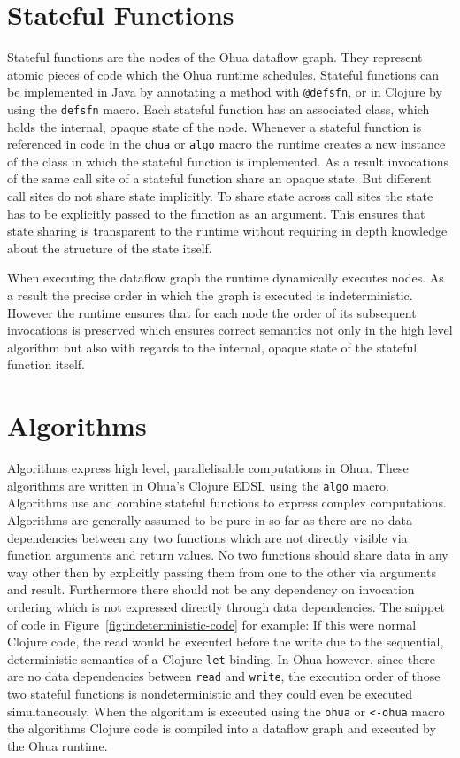 \section{Stateful Functions}


Stateful functions are the nodes of the Ohua dataflow graph.
They represent atomic pieces of code which the Ohua runtime schedules.
Stateful functions can be implemented in Java by annotating a method with \texttt{@defsfn}, or in Clojure by using the \texttt{defsfn} macro.
Each stateful function has an associated class, which holds the internal, opaque state of the node.
Whenever a stateful function is referenced in code in the \texttt{ohua} or \texttt{algo} macro the runtime creates a new instance of the class in which the stateful function is implemented.
As a result invocations of the same call site of a stateful function share an opaque state.
But different call sites do not share state implicitly.
To share state across call sites the state has to be explicitly passed to the function as an argument.
This ensures that state sharing is transparent to the runtime without requiring in depth knowledge about the structure of the state itself.

When executing the dataflow graph the runtime dynamically executes nodes.
As a result the precise order in which the graph is executed is indeterministic.
However the runtime ensures that for each node the order of its subsequent invocations is preserved which ensures correct semantics not only in the high level algorithm but also with regards to the internal, opaque state of the stateful function itself.

\section{Algorithms}

Algorithms express high level, parallelisable computations in Ohua.
These algorithms are written in Ohua's Clojure EDSL using the \texttt{algo} macro.
Algorithms use and combine stateful functions to express complex computations.
Algorithms are generally assumed to be pure in so far as there are no data dependencies between any two functions which are not directly visible via function arguments and return values.
No two functions should share data in any way other then by explicitly passing them from one to the other via arguments and result.
Furthermore there should not be any dependency on invocation ordering which is not expressed directly through data dependencies.
The snippet of code in Figure~\ref{fig:indeterministic-code} for example: If this were normal Clojure code, the read would be executed before the write due to the sequential, deterministic semantics of a Clojure \texttt{let} binding.
In Ohua however, since there are no data dependencies between \texttt{read} and \texttt{write}, the execution order of those two stateful functions is nondeterministic and they could even be executed simultaneously.
When the algorithm is executed using the \texttt{ohua} or \texttt{<-ohua} macro the algorithms Clojure code is compiled into a dataflow graph and executed by the Ohua runtime.


